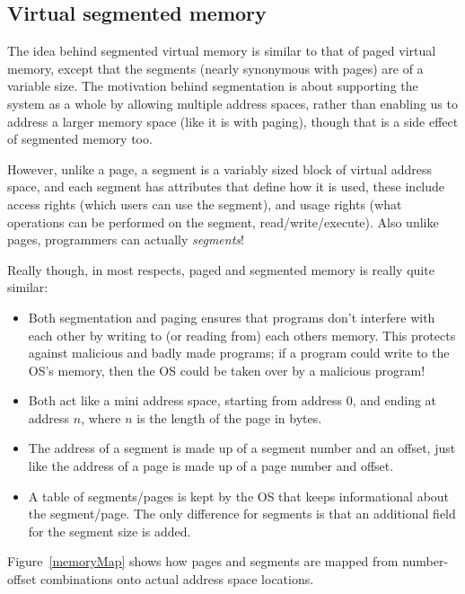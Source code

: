 \subsection{Virtual segmented memory}

The idea behind segmented virtual memory is similar to that of paged virtual
memory, except that the segments (nearly synonymous with pages) are of a
variable size. The motivation behind segmentation is about supporting the system
as a whole by allowing multiple address spaces, rather than enabling us to
address a larger memory space (like it is with paging), though that is a side
effect of segmented memory too.

However, unlike a page, a segment is a variably sized block of virtual address
space, and each segment has attributes that define how it is used, these include
access rights (which users can use the segment), and usage rights (what
operations can be performed on the segment, read/write/execute). Also unlike
pages, programmers can actually \textit{segments}!

Really though, in most respects, paged and segmented memory is really quite
similar:

\begin{itemize}
  \item Both segmentation and paging ensures that programs don't interfere with
  each other by writing to (or   reading from) each others memory. This
  protects against malicious and badly   made programs; if a program could
  write to the OS's memory, then the OS could be taken over by a malicious
  program!

  \item Both act like a mini address space, starting from address 0, and ending
  at address $n$, where $n$ is the length of the page in bytes.

  \item The address of a segment is made up of a segment number and an offset,
  just like the address of a page is made up of a page number and offset.

  \item A table of segments/pages is kept by the OS that keeps informational
  about the segment/page. The only difference for segments is that an additional
  field for the segment size is added.
\end{itemize}

Figure~\ref{memoryMap} shows how pages and segments are mapped from number-
offset combinations onto actual address space locations.


